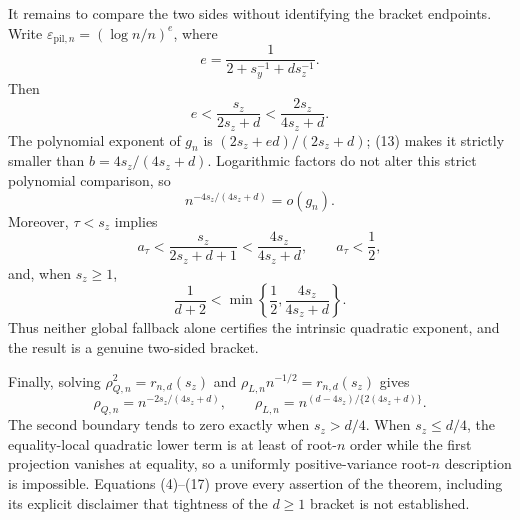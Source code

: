It remains to compare the two sides without identifying the bracket endpoints.  Write \(\varepsilon_{\mathrm{pil},n}=(\log n/n)^e\), where
\[
e=\frac1{2+s_y^{-1}+ds_z^{-1}}.
\]
Then
\[
e<\frac{s_z}{2s_z+d}<\frac{2s_z}{4s_z+d}. \tag{13}
\]
The polynomial exponent of \(g_n\) is \((2s_z+ed)/(2s_z+d)\); (13) makes it strictly smaller than \(b=4s_z/(4s_z+d)\).  Logarithmic factors do not alter this strict polynomial comparison, so
\[
n^{-4s_z/(4s_z+d)}=o(g_n). \tag{14}
\]
Moreover, \(\tau<s_z\) implies
\[
a_\tau<\frac{s_z}{2s_z+d+1}<\frac{4s_z}{4s_z+d},
\qquad a_\tau<\frac12, \tag{15}
\]
and, when \(s_z\ge1\),
\[
\frac1{d+2}<\min\!\left\{\frac12,\frac{4s_z}{4s_z+d}\right\}. \tag{16}
\]
Thus neither global fallback alone certifies the intrinsic quadratic exponent, and the result is a genuine two-sided bracket.

Finally, solving \(\rho_{Q,n}^2=r_{n,d}(s_z)\) and \(\rho_{L,n}n^{-1/2}=r_{n,d}(s_z)\) gives
\[
\rho_{Q,n}=n^{-2s_z/(4s_z+d)},
\qquad
\rho_{L,n}=n^{(d-4s_z)/\{2(4s_z+d)\}}. \tag{17}
\]
The second boundary tends to zero exactly when \(s_z>d/4\).  When \(s_z\le d/4\), the equality-local quadratic lower term is at least of root-\(n\) order while the first projection vanishes at equality, so a uniformly positive-variance root-\(n\) description is impossible.  Equations (4)--(17) prove every assertion of the theorem, including its explicit disclaimer that tightness of the \(d\ge1\) bracket is not established.